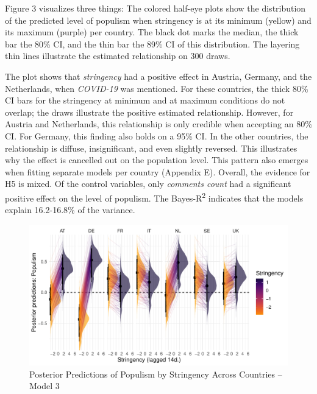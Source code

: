 \documentclass[
]{ccr}
\begin{document}
Figure 3 visualizes three things: The colored half-eye plots show the
distribution of the predicted level of populism when stringency is at
its minimum (yellow) and its maximum (purple) per country. The black dot
marks the median, the thick bar the 80\% CI, and the thin bar the 89\%
CI of this distribution. The layering thin lines illustrate the
estimated relationship on 300 draws.

The plot shows that \emph{stringency} had a positive effect in Austria,
Germany, and the Netherlands, when \emph{COVID-19} was mentioned. For
these countries, the thick 80\% CI bars for the stringency at minimum
and at maximum conditions do not overlap; the draws illustrate the
positive estimated relationship. However, for Austria and Netherlands,
this relationship is only credible when accepting an 80\% CI. For
Germany, this finding also holds on a 95\% CI. In the other countries,
the relationship is diffuse, insignificant, and even slightly reversed.
This illustrates why the effect is cancelled out on the population
level. This pattern also emerges when fitting separate models per
country (Appendix E). Overall, the evidence for H5 is mixed. Of the
control variables, only \emph{comments count} had a significant positive
effect on the level of populism. The Bayes-R\textsuperscript{2}
indicates that the models explain 16.2-16.8\% of the variance.

\begin{figure}

{\centering \includegraphics{plots/plot_M11_strgXcov_byctry_LINES_300draws_20240226.pdf}

}

\caption{Posterior Predictions of Populism by Stringency Across
Countries -- Model 3}

\end{figure}
\end{document}
